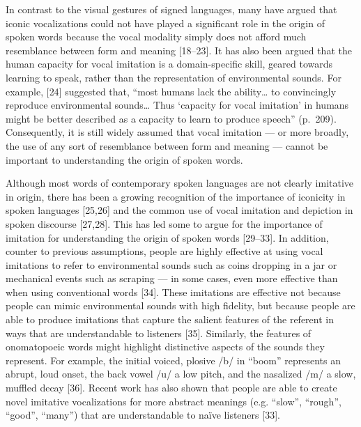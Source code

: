 \documentclass[english,floatsintext,man]{apa6}
\theoremstyle{definition}
\theoremstyle{definition}
\theoremstyle{definition}
\theoremstyle{remark}
\begin{document}
In contrast to the visual gestures of signed languages, many have argued
that iconic vocalizations could not have played a significant role in
the origin of spoken words because the vocal modality simply does not
afford much resemblance between form and meaning {[}18--23{]}. It has
also been argued that the human capacity for vocal imitation is a
domain-specific skill, geared towards learning to speak, rather than the
representation of environmental sounds. For example, {[}24{]} suggested
that, \enquote{most humans lack the ability\ldots{} to convincingly
reproduce environmental sounds\ldots{} Thus \enquote{capacity for vocal
imitation} in humans might be better described as a capacity to learn to
produce speech} (p.~209). Consequently, it is still widely assumed that
vocal imitation --- or more broadly, the use of any sort of resemblance
between form and meaning --- cannot be important to understanding the
origin of spoken words.

Although most words of contemporary spoken languages are not clearly
imitative in origin, there has been a growing recognition of the
importance of iconicity in spoken languages {[}25,26{]} and the common
use of vocal imitation and depiction in spoken discourse {[}27,28{]}.
This has led some to argue for the importance of imitation for
understanding the origin of spoken words {[}29--33{]}. In addition,
counter to previous assumptions, people are highly effective at using
vocal imitations to refer to environmental sounds such as coins dropping
in a jar or mechanical events such as scraping --- in some cases, even
more effective than when using conventional words {[}34{]}. These
imitations are effective not because people can mimic environmental
sounds with high fidelity, but because people are able to produce
imitations that capture the salient features of the referent in ways
that are understandable to listeners {[}35{]}. Similarly, the features
of onomatopoeic words might highlight distinctive aspects of the sounds
they represent. For example, the initial voiced, plosive /b/ in
\enquote{boom} represents an abrupt, loud onset, the back vowel /u/ a
low pitch, and the nasalized /m/ a slow, muffled decay {[}36{]}. Recent
work has also shown that people are able to create novel imitative
vocalizations for more abstract meanings (e.g. \enquote{slow},
\enquote{rough}, \enquote{good}, \enquote{many}) that are understandable
to naïve listeners {[}33{]}.
\end{document}
